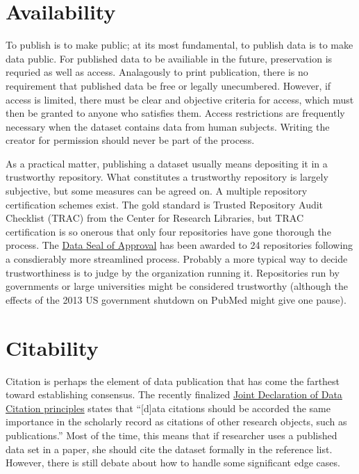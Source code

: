 \documentclass[10pt,a4paper,twocolumn]{article}
\begin{document}

\section*{Availability}\label{availability}

To publish is to make public; at its most fundamental, to publish data is to make data public. 
For published data to be availiable in the future, preservation is requried as well as access.
Analagously to print publication, there is no requirement that published data be free or legally unecumbered.
However, if access is limited, there must be clear and objective criteria for access, which must then be granted to anyone who satisfies them.
Access restrictions are frequently necessary when the dataset contains data from human subjects.
Writing the creator for permission should never be part of the process.

As a practical matter, publishing a dataset usually means depositing it in a trustworthy repository. 
What constitutes a trustworthy repository is largely subjective, but some measures can be agreed on. 
A multiple repository certification schemes exist.
The gold standard is Trusted Repository Audit Checklist (TRAC)\cite{trac_2007} from the Center for Research Libraries, but TRAC certification is so onerous that only four repositories have gone thorough the process. 
The \href{http://datasealofapproval.org/}{Data Seal of Approval} has been awarded to 24 repositories following a consdierably more streamlined process.
Probably a more typical way to decide trustworthiness is to judge by the organization running it. 
Repositories run by governments or large universities might be considered trustworthy (although the effects of the 2013 US government shutdown on PubMed might give one pause).


\section*{Citability}\label{citability}

Citation is perhaps the element of data publication that has come the farthest toward establishing consensus.
The recently finalized \href{http://www.force11.org/datacitation}{Joint Declaration of Data Citation principles} states that ``[d]ata citations should be accorded the same importance in the scholarly record as citations of other research objects, such as publications.''
Most of the time, this means that if researcher uses a published data set in a paper, she should cite the dataset formally in the reference list. 
However, there is still debate about how to handle some significant edge cases.
\end{document}
